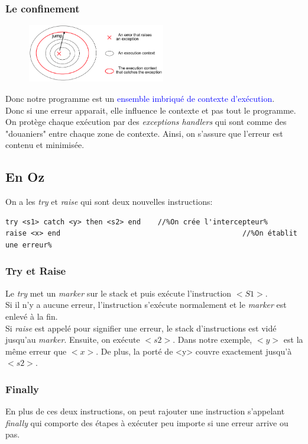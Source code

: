 \documentclass{report}
\begin{document}
\subsubsection{Le confinement}
\begin{figure}
\centering
\includegraphics[width=6cm]{img/handler.png}
\end{figure}
Donc notre programme est un \textcolor{blue}{ensemble imbriqué de contexte d'exécution}.\\
Donc si une erreur apparait, elle influence le contexte et pas tout le programme.\\
On protège chaque exécution par des \textit{exceptions handlers} qui sont comme des "douaniers" entre chaque zone de contexte. Ainsi, on s'assure que l'erreur est contenu et minimisée.

\subsection{En Oz}
On a les \textit{try} et \textit{raise} qui sont deux nouvelles instructions:
\begin{lstlisting}[escapechar=\%]
try <s1> catch <y> then <s2> end	//%On crée l'intercepteur%
raise <x> end											//%On établit une erreur%
\end{lstlisting}

\subsubsection{Try et Raise}
Le \textit{try} met un \textit{marker} sur le stack et puis exécute l'instruction $<S1>$.\\
Si il n'y a aucune erreur, l'instruction s'exécute normalement et le \textit{marker} est enlevé à la fin.\\
Si \textit{raise} est appelé pour signifier une erreur, le stack d'instructions est vidé jusqu'au \textit{marker}. Ensuite, on exécute $<s2>$. Dans notre exemple, $<y>$ est la même erreur que $<x>$. De plus, la porté de <y> couvre exactement jusqu'à $<s2>$.

\subsubsection{Finally}
En plus de ces deux instructions, on peut rajouter une instruction s'appelant \textit{finally} qui comporte des étapes à exécuter peu importe si une erreur arrive ou pas.
\end{document}
